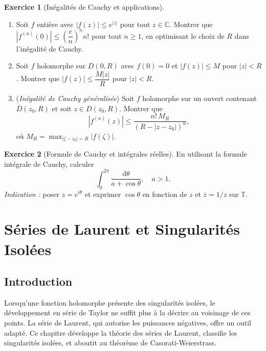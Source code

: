 \documentclass[12pt,a4paper,openany]{book}
\theoremstyle{definition}
\newtheorem{exercice}{Exercice}[chapter]
\theoremstyle{plain}
\theoremstyle{remark}
\newcommand{\C}{\mathbb{C}}
\newcommand{\T}{\mathbb{T}}
\newcommand{\dd}{\mathrm{d}}
\newcommand{\abs}[1]{\left|#1\right|}
\newcommand{\conj}[1]{\overline{#1}}
\begin{document}
\begin{exercice}[Inégalités de Cauchy et applications]\label{exo:cauchy-ineq}
\begin{enumerate}[label=\textbf{\alph*)}]
  \item Soit $f$ entière avec $\abs{f(z)} \leq e^{\abs{z}}$ pour tout
        $z \in \C$. Montrer que $\abs{f^{(n)}(0)} \leq \left(\dfrac{e}{n}\right)^n n!$
        pour tout $n \geq 1$, en optimisant le choix de $R$ dans
        l'inégalité de Cauchy.
  \item Soit $f$ holomorphe sur $D(0,R)$ avec $f(0) = 0$ et
        $\abs{f(z)} \leq M$ pour $\abs{z} < R$. Montrer que
        $\abs{f(z)} \leq \dfrac{M\abs{z}}{R}$ pour $\abs{z} < R$.
  \item (\emph{Inégalité de Cauchy généralisée}) Soit $f$ holomorphe
        sur un ouvert contenant $\overline{D}(z_0,R)$ et soit
        $z \in D(z_0,R)$. Montrer que
        \[
          \abs{f^{(n)}(z)} \leq \frac{n!\,M_R}{(R - \abs{z - z_0})^n},
        \]
        où $M_R = \max_{\abs{\zeta - z_0}=R}\abs{f(\zeta)}$.
\end{enumerate}
\end{exercice}

\begin{exercice}[Formule de Cauchy et intégrales réelles]\label{exo:cauchy-real}
En utilisant la formule intégrale de Cauchy, calculer
\[
  \int_0^{2\pi} \frac{\dd\theta}{a + \cos\theta}, \quad a > 1.
\]
\emph{Indication :} poser $z = e^{i\theta}$ et exprimer $\cos\theta$
en fonction de $z$ et $\conj{z} = 1/z$ sur $\T$.
\end{exercice}


\chapter{Séries de Laurent et Singularités Isolées}\label{chap:laurent}

\section{Introduction}

Lorsqu'une fonction holomorphe présente des singularités isolées, le
développement en série de Taylor ne suffit plus à la décrire au voisinage
de ces points. La série de Laurent, qui autorise les puissances négatives,
offre un outil adapté. Ce chapitre développe la théorie des séries de
Laurent, classifie les singularités isolées, et aboutit au théorème de
Casorati-Weierstrass.
\end{document}
